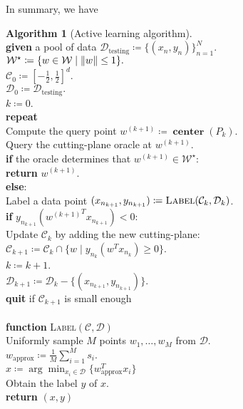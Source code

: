 \documentclass[11pt]{amsart}
\theoremstyle{definition}
\newtheorem{algorithm}{Algorithm}
\theoremstyle{remark}
\newcommand{\ind}{\hspace*{0.5cm}}
\newcommand{\transpose}{T}
\DeclareMathOperator{\centerr}{\textbf{center}}
\begin{document}
        In summary, we have
        \begin{algorithm}[Active learning algorithm]
        \label{a:active}\mbox{}\\
            \ind \textbf{given} a pool of data $\mathcal{D}_\text{testing} \coloneqq \{(x_n, y_n)\}_{n=1}^N$. \\
            \ind $\mathcal{W}^\star \coloneqq \{w \in \mathcal{W} \;|\; \norm{w} \leq 1\}.$ \\
            \ind $\mathcal{C}_0 \coloneqq [-\frac{1}{2}, \frac{1}{2}]^d.$ \\
            \ind $\mathcal{D}_0 \coloneqq \mathcal{D}_\text{testing}.$ \\
            \ind $k \coloneqq 0$. \\
            \ind \textbf{repeat} \\
            \ind\ind Compute the query point $w^{(k+1)} \coloneqq \centerr({P}_k)$. \\
            \ind\ind Query the cutting-plane oracle at $w^{(k+1)}$. \\
            \ind\ind \textbf{if} the oracle determines that $w^{(k+1)} \in \mathcal{W}^\star$: \\
            \ind\ind\ind\textbf{return} $w^{(k+1)}$. \\
            \ind\ind \textbf{else}: \\
            \ind\ind\ind Label a data point $(x_{n_{k+1}}, y_{n_{k+1}}) \coloneqq \textsc{Label}(\mathcal{C}_k, \mathcal{D}_k)$. \\
            \ind\ind\ind \textbf{if} $y_{n_{k+1}} ({w^{(k+1)}}^\transpose x_{n_{k+1}}) < 0:$ \\
            \ind\ind\ind\ind Update $\mathcal{C}_k$ by adding the new cutting-plane: \\
            \ind\ind\ind\ind\ind $\mathcal{C}_{k+1} \coloneqq \mathcal{C}_{k} \cap \{w \;|\; y_{n_k} (w^\transpose x_{n_k}) \geq 0\}$. \\
            \ind\ind $k \coloneqq k + 1$. \\
            \ind\ind $\mathcal{D}_{k+1} \coloneqq \mathcal{D}_k - \{(x_{n_{k+1}}, y_{n_{k+1}})\}$. \\
            \ind\ind \textbf{quit} if $\mathcal{C}_{k+1}$ is small enough \\ \\
            \ind \textbf{function} \textsc{Label}$(\mathcal{C}, \mathcal{D})$ \\
            \ind\ind Uniformly sample $M$ points $w_1, \dots, w_M$ from $\mathcal{D}$. \\
            \ind\ind $w_\text{approx} \coloneqq \frac{1}{M} \sum_{i=1}^M s_i$. \\
            \ind\ind $x \coloneqq \arg \min_{x_i \in \mathcal{D}} \{w_\text{approx}^\transpose x_i \}$ \\
            \ind\ind Obtain the label $y$ of $x$. \\
            \ind \textbf{return} $(x, y) $     
            \end{algorithm}
\end{document}
